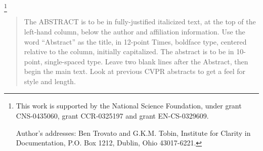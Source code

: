 
\thanks{This work is supported by the National Science Foundation,
  under grant CNS-0435060, grant CCR-0325197 and grant EN-CS-0329609.

  Author's addresses: Ben Trovato {and} G.K.M. Tobin, Institute for Clarity in Documentation,
  P.O. Box 1212, Dublin, Ohio 43017-6221.}

\begin{abstract}
\begin{DRAFT}
The ABSTRACT is to be in fully-justified italicized text, at the top
of the left-hand column, below the author and affiliation
information. Use the word ``Abstract'' as the title, in 12-point
Times, boldface type, centered relative to the column, initially
capitalized. The abstract is to be in 10-point, single-spaced type.
Leave two blank lines after the Abstract, then begin the main text.
Look at previous CVPR abstracts to get a feel for style and length.
\end{DRAFT}
\end{abstract}